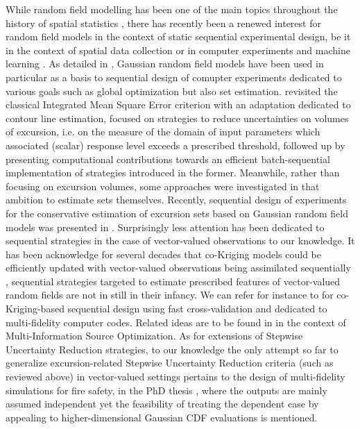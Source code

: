 \documentclass[aoas]{imsart}
\begin{document}
 While random field modelling has been one of the main topics throughout the history of spatial statistics \citep{Krige1951a, Matheron1963, Stein1999, Adler.Taylor2007}, there has recently been a renewed interest for random field models in the context of static sequential experimental design, be it in the context of spatial data collection \citep{Mueller2007} or in computer experiments and machine learning \citep[See for instance][and references therein]{Santner.etal2003, Romero.etal2013, Beck2016}. As detailed in \cite{Ginsbourger2018}, Gaussian random field models have been used in particular as a basis to sequential design of comupter experiments dedicated to various goals such as global optimization but also set estimation.  \cite{Picheny.etal2010} revisited the classical Integrated Mean Square Error criterion with an adaptation dedicated to contour line estimation, \cite{Bect.etal2012} focused on strategies to reduce uncertainties on volumes of excursion, i.e. on the measure of the domain of input parameters which associated (scalar) response level exceeds a prescribed threshold, followed up by \cite{chevalier2014fast} presenting computational contributions towards an efficient batch-sequential implementation of strategies introduced in the former. Meanwhile, rather than focusing on excursion volumes, some approaches were investigated in \cite{French.Sain2013,Chevalier.etal2013b,Bolin.Lindgren2015,Azzimonti.etal2016} that ambition to estimate sets themselves. Recently, sequential design of experiments for the conservative estimation of excursion sets based on Gaussian random field models was presented in \citep{Azzimonti.etal}. 
Surprisingly less attention has been dedicated to sequential strategies in the case of vector-valued observations to our knowledge. It has been acknowledge for several decades that co-Kriging models could be efficiently updated with vector-valued observations being assimilated sequentially 
\cite{Vargas-Guzman1999}, sequential strategies targeted to estimate prescribed features of vector-valued random fields are not in still in their infancy. We can refer for instance to \citep{LeGratiet.etal2015} for co-Kriging-based sequential design using fast cross-validation and dedicated to multi-fidelity computer codes. Related ideas are to be found in \cite{Poloczek2017} in the context of Multi-Information Source Optimization. As for extensions of Stepwise Uncertainty Reduction strategies, to our knowledge the only attempt so far to generalize excursion-related Stepwise Uncertainty Reduction criteria (such as reviewed above) in vector-valued settings pertains to the design of multi-fidelity simulations for fire safety, in the PhD thesis \citep[][p.82]{stroh}, where the outputs are mainly assumed independent yet the feasibility of treating the dependent case by appealing to higher-dimensional Gaussian CDF evaluations is mentioned. 
\end{document}
